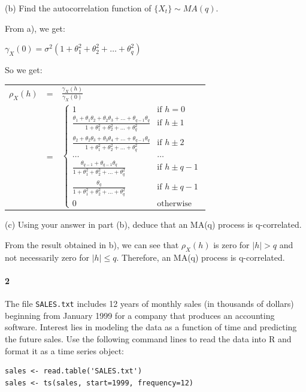 \documentclass[]{article}
\let\oldparagraph\paragraph
\renewcommand{\paragraph}[1]{\oldparagraph{#1}\mbox{}}
\begin{document}
(b) Find the autocorrelation function of $\{X_t\} \sim MA(q)$.

\color{blue}
From a), we get:

$\gamma_X(0) = \sigma^2(1 + \theta_1^2 + \theta_2^2 + \ldots + \theta_q^2)$

So we get:

\begin{tabular}{ccl}
$\rho_X(h)$ & = & $\frac{\gamma_X(h)}{\gamma_X(0)}$\\
            & = &
$\begin{cases}
1 & \mbox{if } h = 0\\
\frac{\theta_1 + \theta_1 \theta_2 + \theta_2 \theta_3 + \ldots + \theta_{q-1} \theta_q}{1 + \theta_1^2 + \theta_2^2 + \ldots + \theta_q^2} & \mbox{if } h \pm 1\\
\frac{\theta_2 + \theta_2 \theta_3 + \theta_3 \theta_4 + \ldots + \theta_{q-1} \theta_q}{1 + \theta_1^2 + \theta_2^2 + \ldots + \theta_q^2} & \mbox{if } h \pm 2\\
\ldots & \ldots\\
\frac{\theta_{q-1} + \theta_{q-1} \theta_q}{1 + \theta_1^2 + \theta_2^2 + \ldots + \theta_q^2} & \mbox{if } h \pm q-1\\
\frac{\theta_q}{1 + \theta_1^2 + \theta_2^2 + \ldots + \theta_q^2} & \mbox{if } h \pm q-1\\
0 & \mbox{otherwise}
\end{cases}$\\
\end{tabular}
\color{black}

(c) Using your answer in part (b), deduce that an MA(q) process is q-correlated.

\color{blue}
From the result obtained in b), we can see that $\rho_X(h)$ is zero for $|h| > q$ and not necessarily zero for $|h| \leq q$. Therefore, an MA(q) process is q-correlated.
\color{black}

\paragraph{2}
The file \texttt{SALES.txt} includes 12 years of monthly sales (in thousands of dollars) beginning from January 1999 for a company that produces an accounting software. Interest lies in modeling the data as a function of time and predicting the future sales. Use the following command lines to read the data into R and format it as a time series object:

\begin{Verbatim}[frame=single]
sales <- read.table('SALES.txt')
sales <- ts(sales, start=1999, frequency=12)
\end{Verbatim}
\end{document}
